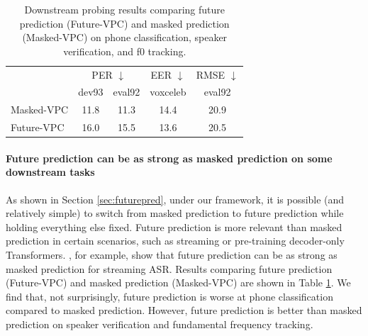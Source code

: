 \begin{table}
    \caption{Downstream probing results comparing future prediction (Future-VPC) and masked prediction (Masked-VPC) on phone classification, speaker verification, and f0 tracking.}
    \label{tab:downstream2}
    \centering
    \footnotesize
    \begin{tabularx}{0.98\linewidth}{lcccc}
        \toprule
           &\multicolumn{2}{c}{PER $\downarrow$} &EER $\downarrow$ &RMSE $\downarrow$  \\
           &dev93 &eval92 &voxceleb &eval92  \\[1pt]
        \midrule                                                                                                                 
        Masked-VPC          &11.8          &11.3           &14.4     &20.9  \\
        Future-VPC          &16.0          &15.5           &13.6     &20.5  \\
        \bottomrule
    \end{tabularx}
\end{table}

\paragraph{Future prediction can be as strong as masked prediction on some downstream tasks}

As shown in Section \ref{sec:futurepred}, under our framework, it is possible (and relatively simple) to switch from masked prediction to future prediction while holding everything else fixed.
Future prediction is more relevant than masked prediction in certain scenarios, such as streaming or pre-training decoder-only Transformers.
\citet{misra21_interspeech}, for example, show that future prediction can be as strong as masked prediction for streaming ASR.
Results comparing future prediction (Future-VPC) and masked prediction (Masked-VPC) are shown in Table \ref{tab:downstream2}.
We find that, not surprisingly, future prediction is worse at phone classification compared to masked prediction.
However, future prediction is better than masked prediction on speaker verification and fundamental frequency tracking.

%
%
%
%
%
%
%

